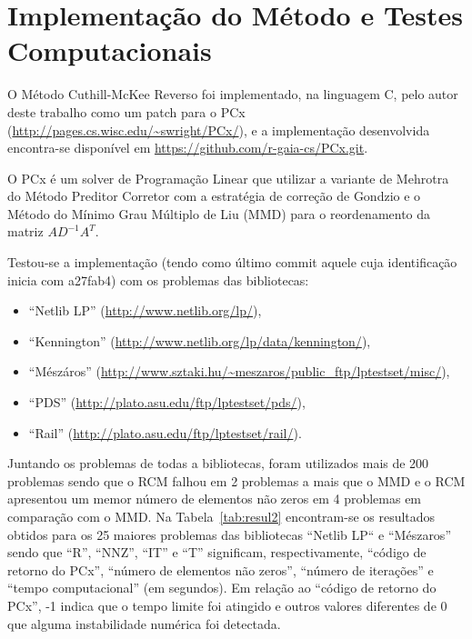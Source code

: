 \section{Implementação do Método e Testes Computacionais}
O Método Cuthill-McKee Reverso foi implementado, na linguagem C, pelo autor
deste trabalho como um patch para o PCx
(\url{http://pages.cs.wisc.edu/~swright/PCx/}), e a implementação desenvolvida
encontra-se disponível em \url{https://github.com/r-gaia-cs/PCx.git}.

O PCx é um solver de Programação Linear que utilizar a variante de Mehrotra do
Método Preditor Corretor com a estratégia de correção de Gondzio e o Método do
Mínimo Grau Múltiplo de Liu\cite{George:1981:ComputerSolutionPD} (MMD) para o
reordenamento da matriz $A D^{-1} A^T$.

Testou-se a implementação (tendo como último commit aquele cuja identificação
inicia com a27fab4) com os problemas das bibliotecas:
\begin{itemize}
  \item ``Netlib LP'' (\url{http://www.netlib.org/lp/}),
  \item ``Kennington'' (\url{http://www.netlib.org/lp/data/kennington/}),
  \item ``Mészáros'' (\url{http://www.sztaki.hu/~meszaros/public_ftp/lptestset/misc/}),
  \item ``PDS'' (\url{http://plato.asu.edu/ftp/lptestset/pds/}),
  \item ``Rail'' (\url{http://plato.asu.edu/ftp/lptestset/rail/}).
\end{itemize}

Juntando os problemas de todas a bibliotecas, foram utilizados mais de 200
problemas sendo que o RCM falhou em 2 problemas a mais que o MMD e o RCM
apresentou um memor número de elementos não zeros em 4 problemas em comparação
com o MMD. Na Tabela~\ref{tab:resul2} encontram-se os resultados obtidos para
os 25 maiores problemas das bibliotecas ``Netlib LP`` e ``Mészaros'' sendo que
``R'', ``NNZ'', ``IT'' e ``T'' significam, respectivamente, ``código de retorno do
PCx'', ``número de elementos não zeros'', ``número de iterações'' e ``tempo
computacional'' (em segundos). Em relação ao ``código de retorno do PCx'', -1
indica que o tempo limite foi atingido e outros valores diferentes de 0 que
alguma instabilidade numérica foi detectada.
